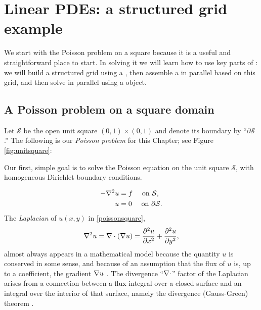 
\chapter{Linear PDEs: a structured grid example}
\label{chap:structured}

We start with the Poisson problem on a square because it is a useful and straightforward place to start.  In solving it we will learn how to use key parts of \PETSc: we will build a structured grid using a \PETSc \pDMDA, then assemble a \pMat in parallel based on this grid, and then solve in parallel using a \pKSP object.

\section{A Poisson problem on a square domain}

Let $\mathcal{S}$ be the open unit square $(0,1)\times(0,1)$ and denote its boundary by ``$\partial\mathcal{S}$.'' The following is our \emph{Poisson problem} for this Chapter;  see Figure \ref{fig:unitsquare}:
\begin{marginfigure}
\caption{Our first, simple goal is to solve the Poisson equation on the unit square $\mathcal{S}$, with homogeneous Dirichlet boundary conditions.}
\label{fig:unitsquare}
\end{marginfigure}
\begin{align}
- \nabla^2 u &= f \quad \text{ on } \mathcal{S}, \label{poissonsquare} \\
u &= 0 \quad \text{ on } \partial \mathcal{S}. \label{poissonsquarebcs}
\end{align}
The \emph{Laplacian} of $u(x,y)$ in \eqref{poissonsquare},
    $$\nabla^2 u = \nabla\cdot(\nabla u) = \frac{\partial^2 u}{\partial x^2} + \frac{\partial^2 u}{\partial y^2},$$
almost always appears in a mathematical model because the quantity $u$ is conserved in some sense, and because of an assumption that the flux of $u$ is, up to a coefficient, the gradient $\nabla u$ \citep{Ockendonetal2003}.  The divergence ``$\nabla\cdot$'' factor of the Laplacian arises from a connection between a flux integral over a closed surface and an integral over the interior of that surface, namely the divergence (Gauss-Green) theorem \citep[Appendix C]{Evans}.

